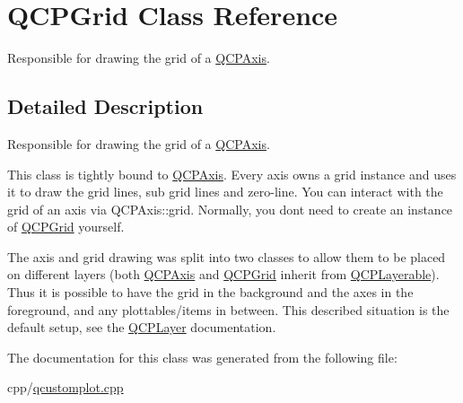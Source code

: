 \hypertarget{class_q_c_p_grid}{}\section{Q\+C\+P\+Grid Class Reference}
\label{class_q_c_p_grid}


Responsible for drawing the grid of a \mbox{\hyperlink{class_q_c_p_axis}{Q\+C\+P\+Axis}}.  




\subsection{Detailed Description}
Responsible for drawing the grid of a \mbox{\hyperlink{class_q_c_p_axis}{Q\+C\+P\+Axis}}. 

This class is tightly bound to \mbox{\hyperlink{class_q_c_p_axis}{Q\+C\+P\+Axis}}. Every axis owns a grid instance and uses it to draw the grid lines, sub grid lines and zero-\/line. You can interact with the grid of an axis via Q\+C\+P\+Axis\+::grid. Normally, you don\textquotesingle{}t need to create an instance of \mbox{\hyperlink{class_q_c_p_grid}{Q\+C\+P\+Grid}} yourself.

The axis and grid drawing was split into two classes to allow them to be placed on different layers (both \mbox{\hyperlink{class_q_c_p_axis}{Q\+C\+P\+Axis}} and \mbox{\hyperlink{class_q_c_p_grid}{Q\+C\+P\+Grid}} inherit from \mbox{\hyperlink{class_q_c_p_layerable}{Q\+C\+P\+Layerable}}). Thus it is possible to have the grid in the background and the axes in the foreground, and any plottables/items in between. This described situation is the default setup, see the \mbox{\hyperlink{class_q_c_p_layer}{Q\+C\+P\+Layer}} documentation. 

The documentation for this class was generated from the following file\+:\begin{DoxyCompactItemize}
\item 
cpp/\mbox{\hyperlink{qcustomplot_8cpp}{qcustomplot.\+cpp}}\end{DoxyCompactItemize}
